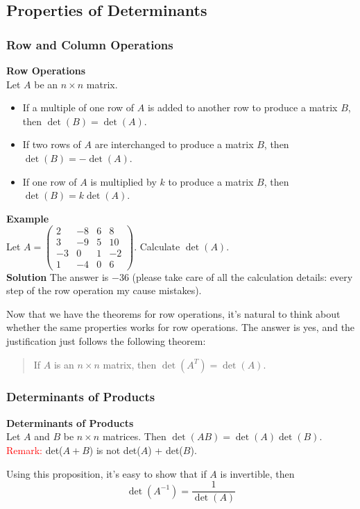 \documentclass[10pt, a4paper]{article}
\begin{document}
\subsection{Properties of Determinants}
\subsubsection*{Row and Column Operations}
\begin{proposition}
    \textbf{Row Operations}\\
    Let $A$ be an $n\times n$ matrix.
    \begin{itemize}
        \item If a multiple of one row of $A$ is added to another row to produce a matrix $B$, then $\det(B) = \det(A)$.
        \item If two rows of $A$ are interchanged to produce a matrix $B$, then $\det(B) = -\det(A)$.
        \item If one row of $A$ is multiplied by $k$ to produce a matrix $B$, then $\det(B) = k\det(A)$.
    \end{itemize}
\end{proposition}
\begin{example}
    \textbf{Example} \\
    Let $A = \begin{pmatrix} 
        2 & -8 & 6 & 8\\
        3 &-9 & 5 & 10\\
        -3 & 0 & 1 & -2\\
        1 & -4 & 0 & 6
     \end{pmatrix}$. Calculate $\det(A)$.\\
    \textbf{Solution} 
    The answer is $-36$ (please take care of all the calculation details: every step of the row operation my cause mistakes).
\end{example}
Now that we have the theorems for row operations, it's natural to think about whether the same properties works for row operations. The answer is yes, and the justification just follows the following theorem:
\begin{quote}
    If $A$ is an $n\times n$ matrix, then $\det(A^T) = \det(A)$.
\end{quote}
\subsubsection*{Determinants of Products}
\begin{proposition}
    \textbf{Determinants of Products}\\
    Let $A$ and $B$ be $n\times n$ matrices. Then $\det(AB) = \det(A)\det(B)$.\\
    \textcolor{red}{Remark:} det($A+B$) is not det($A$) + det($B$).
\end{proposition}
\indent Using this proposition, it's easy to show that if $A$ is invertible, then $$\det(A^{-1}) = \frac{1}{\det(A)}$$
\end{document}
